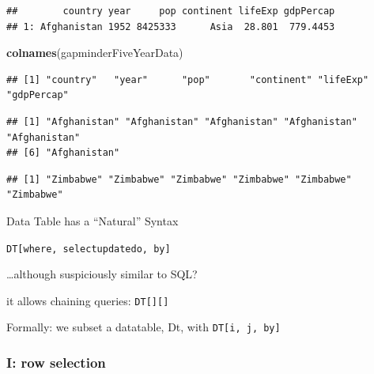 \documentclass[]{article}
\newenvironment{Shaded}{\begin{snugshade}}{\end{snugshade}}
\newcommand{\KeywordTok}[1]{\textcolor[rgb]{0.13,0.29,0.53}{\textbf{{#1}}}}
\newcommand{\NormalTok}[1]{{#1}}
\begin{document}
\begin{verbatim}
##        country year     pop continent lifeExp gdpPercap
## 1: Afghanistan 1952 8425333      Asia  28.801  779.4453
\end{verbatim}

\begin{Shaded}
\begin{Highlighting}[]
\KeywordTok{colnames}\NormalTok{(gapminderFiveYearData)}
\end{Highlighting}
\end{Shaded}

\begin{verbatim}
## [1] "country"   "year"      "pop"       "continent" "lifeExp"   "gdpPercap"
\end{verbatim}

\begin{Shaded}
\end{Shaded}

\begin{verbatim}
## [1] "Afghanistan" "Afghanistan" "Afghanistan" "Afghanistan" "Afghanistan"
## [6] "Afghanistan"
\end{verbatim}

\begin{Shaded}
\end{Shaded}

\begin{verbatim}
## [1] "Zimbabwe" "Zimbabwe" "Zimbabwe" "Zimbabwe" "Zimbabwe" "Zimbabwe"
\end{verbatim}

Data Table has a ``Natural'' Syntax

\texttt{DT{[}where,\ select\textbar{}update\textbar{}do,\ by{]}}

\ldots{}although suspiciously similar to SQL?

it allows chaining queries: \texttt{DT{[}{]}{[}{]}}

Formally: we subset a datatable, Dt, with \texttt{DT{[}i,\ j,\ by{]}}

\subsubsection{I: row selection}\label{i-row-selection}
\end{document}
